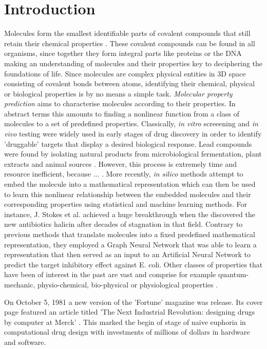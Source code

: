\section{Introduction}\label{sec:introduction}

Molecules form the smallest identifiable parts of covalent compounds that still retain their chemical properties \cite{molecules}. These covalent compounds can be found in all organisms, since together they form integral parts like proteins or the DNA making an understanding of molecules and their properties key to deciphering the foundations of life. Since molecules are complex physical entities in 3D space consisting of covalent bonds between atoms, identifying their chemical, physical or biological properties is by no means a simple task. \emph{Molecular property prediction} aims to characterise molecules according to their properties. In abstract terms this amounts to finding a nonlinear function from a class of molecules to a set of predefined properties.  Classically, \emph{in vitro} screeening and \emph{in vivo} testing were widely used in early stages of drug discovery in order to identify 'druggable' targets that display a desired biological response. Lead compounds were found by isolating natural products from microbiological fermentation, plant extracts and animal sources \cite{Gallop1994ApplicationsOC}. However, this process is extremely time and resource inefficient, because ... . More recently, \emph{in silico} methods attempt to embed the molecule into a mathematical representation which can then be used to learn this nonlinear relationship between the embedded molecules and their corresponding properties using statistical and machine learning methods. For instance, J. Stokes et al. achieved a huge breakthrough when the discovered the new antibiotics halicin \cite{STOKES2020688} after decades of stagnation in that field. Contrary to previous methods that translate molecules into a fixed predefined mathematical representation, they employed a Graph Neural Network that was able to learn a representation that then served as an input to an Artificial Neural Network to predict the target inhibitory effect against E. coli. %
Other classes of properties that have been of interest in the past are vast and comprise for example quantum-mechanic, physio-chemical, bio-physical or physiological properties \cite{wu2018moleculenet}. 

On October 5, 1981 a new version of the 'Fortune' magazine was release. Its cover page featured an article titled 'The   Next Industrial  Revolution:  designing  drugs  by  computer  at Merck' \cite{article}. This marked the begin of stage of naive euphoria in computational drug design with investments of millions of dollars in hardware and software. 
